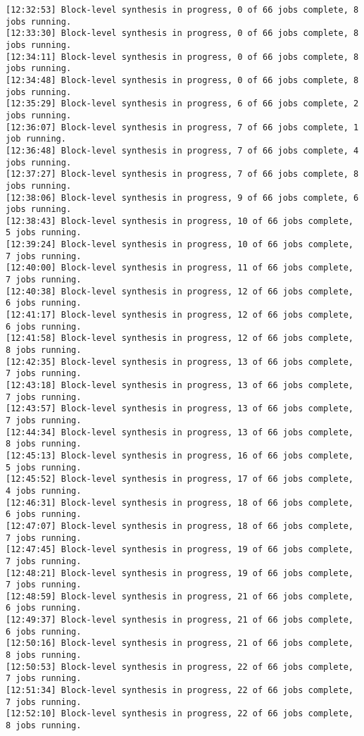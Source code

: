 \begin{lstlisting}[label=func,breaklines=true,breakatwhitespace=false,caption=СОДЕРЖИМОЕ LOG-ФАЙЛА.]
[12:32:53] Block-level synthesis in progress, 0 of 66 jobs complete, 8 jobs running.
[12:33:30] Block-level synthesis in progress, 0 of 66 jobs complete, 8 jobs running.
[12:34:11] Block-level synthesis in progress, 0 of 66 jobs complete, 8 jobs running.
[12:34:48] Block-level synthesis in progress, 0 of 66 jobs complete, 8 jobs running.
[12:35:29] Block-level synthesis in progress, 6 of 66 jobs complete, 2 jobs running.
[12:36:07] Block-level synthesis in progress, 7 of 66 jobs complete, 1 job running.
[12:36:48] Block-level synthesis in progress, 7 of 66 jobs complete, 4 jobs running.
[12:37:27] Block-level synthesis in progress, 7 of 66 jobs complete, 8 jobs running.
[12:38:06] Block-level synthesis in progress, 9 of 66 jobs complete, 6 jobs running.
[12:38:43] Block-level synthesis in progress, 10 of 66 jobs complete, 5 jobs running.
[12:39:24] Block-level synthesis in progress, 10 of 66 jobs complete, 7 jobs running.
[12:40:00] Block-level synthesis in progress, 11 of 66 jobs complete, 7 jobs running.
[12:40:38] Block-level synthesis in progress, 12 of 66 jobs complete, 6 jobs running.
[12:41:17] Block-level synthesis in progress, 12 of 66 jobs complete, 6 jobs running.
[12:41:58] Block-level synthesis in progress, 12 of 66 jobs complete, 8 jobs running.
[12:42:35] Block-level synthesis in progress, 13 of 66 jobs complete, 7 jobs running.
[12:43:18] Block-level synthesis in progress, 13 of 66 jobs complete, 7 jobs running.
[12:43:57] Block-level synthesis in progress, 13 of 66 jobs complete, 7 jobs running.
[12:44:34] Block-level synthesis in progress, 13 of 66 jobs complete, 8 jobs running.
[12:45:13] Block-level synthesis in progress, 16 of 66 jobs complete, 5 jobs running.
[12:45:52] Block-level synthesis in progress, 17 of 66 jobs complete, 4 jobs running.
[12:46:31] Block-level synthesis in progress, 18 of 66 jobs complete, 6 jobs running.
[12:47:07] Block-level synthesis in progress, 18 of 66 jobs complete, 7 jobs running.
[12:47:45] Block-level synthesis in progress, 19 of 66 jobs complete, 7 jobs running.
[12:48:21] Block-level synthesis in progress, 19 of 66 jobs complete, 7 jobs running.
[12:48:59] Block-level synthesis in progress, 21 of 66 jobs complete, 6 jobs running.
[12:49:37] Block-level synthesis in progress, 21 of 66 jobs complete, 6 jobs running.
[12:50:16] Block-level synthesis in progress, 21 of 66 jobs complete, 8 jobs running.
[12:50:53] Block-level synthesis in progress, 22 of 66 jobs complete, 7 jobs running.
[12:51:34] Block-level synthesis in progress, 22 of 66 jobs complete, 7 jobs running.
[12:52:10] Block-level synthesis in progress, 22 of 66 jobs complete, 8 jobs running.

\end{lstlisting}
